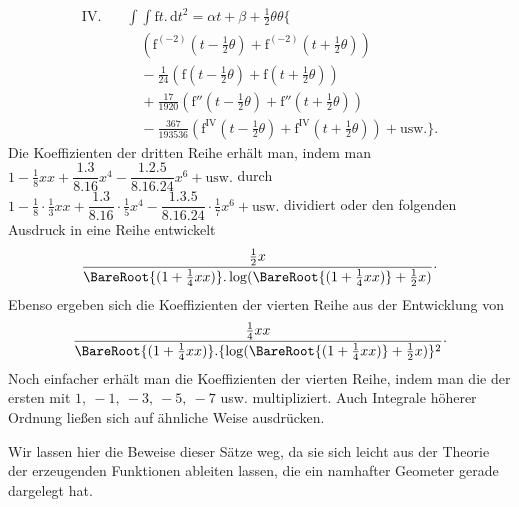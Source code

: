 \[
\begin{aligned}
\mathrm{IV.}\quad&\int\!\int\mathrm{f}t.\,\mathrm{d}t^2=\alpha t+\beta+\tfrac12\theta\theta\bigl\{\\
&\quad(\mathrm{f}^{(-2)}(t-\tfrac12\theta)+\mathrm{f}^{(-2)}(t+\tfrac12\theta))\\
&\quad-\tfrac1{24}(\mathrm{f}(t-\tfrac12\theta)+\mathrm{f}(t+\tfrac12\theta))\\
&\quad+\tfrac{17}{1920}(\mathrm{f}''(t-\tfrac12\theta)+\mathrm{f}''(t+\tfrac12\theta))\\
&\quad-\tfrac{367}{193536}(\mathrm{f}^{\mathrm{IV}}(t-\tfrac12\theta)+\mathrm{f}^{\mathrm{IV}}(t+\tfrac12\theta))+\text{usw.}\bigr\}.
\end{aligned}
\]
Die Koeffizienten der dritten Reihe erhält man, indem man \(1-\tfrac18xx+\dfrac{1.3}{8.16}x^4-\dfrac{1.2.5}{8.16.24}x^6+\text{usw.}\) durch \(1-\tfrac18\cdot\tfrac13xx+\dfrac{1.3}{8.16}\cdot\tfrac15x^4-\dfrac{1.3.5}{8.16.24}\cdot\tfrac17x^6+\text{usw.}\) dividiert oder den folgenden Ausdruck in eine Reihe entwickelt
\[
\dfrac{\tfrac12x}{\BareRoot{(1+\tfrac14xx)}.\log(\BareRoot{(1+\tfrac14xx)}+\tfrac12x)}\mathpunct{\cdot}
\]
Ebenso ergeben sich die Koeffizienten der vierten Reihe aus der Entwicklung von
\[
\dfrac{\tfrac14xx}{\BareRoot{(1+\tfrac14xx)}.\{\log(\BareRoot{(1+\tfrac14xx)}+\tfrac12x)\}^2}\mathpunct{\cdot}
\]
Noch einfacher erhält man die Koeffizienten der vierten Reihe, indem man die der ersten mit \(1,\ -1,\ -3,\ -5,\ -7\) usw. multipliziert. Auch Integrale höherer Ordnung ließen sich auf ähnliche Weise ausdrücken.
\par Wir lassen hier die Beweise dieser Sätze weg, da sie sich leicht aus der Theorie der erzeugenden Funktionen ableiten lassen, die ein namhafter Geometer gerade dargelegt hat.
\par\endgroup
